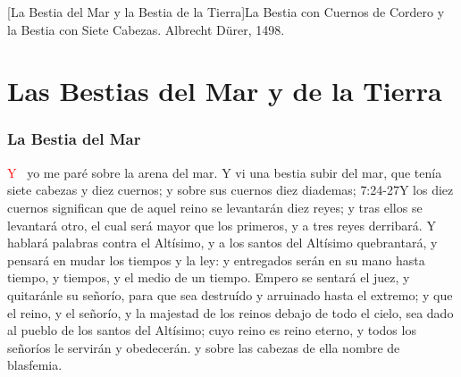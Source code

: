 [La Bestia del Mar y la Bestia de la Tierra]{La Bestia con Cuernos de Cordero y la Bestia con Siete Cabezas. Albrecht Dürer, 1498.}

\chapter{Las Bestias del Mar y de la Tierra}
\subsection*{La Bestia del Mar}
\lettrine[lines=3,slope=-0.5em,loversize=0.1]{\textcolor{red}{Y}}{\ } yo me paré sobre la arena del mar. Y vi una bestia subir del mar, que tenía siete cabezas y diez cuernos; y sobre sus cuernos diez diademas;%
					   {7:24-27}{Y los diez cuernos significan que de aquel reino se levantarán diez reyes; y tras ellos se levantará otro, el cual será mayor que los primeros, y a tres reyes derribará. Y hablará palabras contra el Altísimo, y a los santos del Altísimo quebrantará, y pensará en mudar los tiempos y la ley: y entregados serán en su mano hasta tiempo, y tiempos, y el medio de un tiempo. Empero se sentará el juez, y quitaránle su señorío, para que sea destruído y arruinado hasta el extremo; y que el reino, y el señorío, y la majestad de los reinos debajo de todo el cielo, sea dado al pueblo de los santos del Altísimo; cuyo reino es reino eterno, y todos los señoríos le servirán y obedecerán.}
 y sobre las cabezas de ella nombre de blasfemia.
